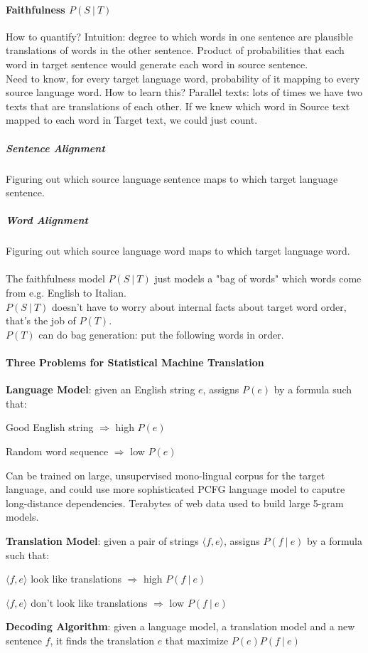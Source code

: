 \documentclass[10pt]{report}
\begin{document}
\paragraph{Faithfulness $P(S\:|\:T)$} How to quantify? Intuition: degree to which words in one sentence are plausible translations of words in the other sentence. Product of probabilities that each word in target sentence would generate each word in source sentence.\\
Need to know, for every target language word, probability of it mapping to every source language word. How to learn this? Parallel texts: lots of times we have two texts that are translations of each other. If we knew which word in Source text mapped to each word in Target text, we could just count.
\subparagraph{Sentence Alignment} Figuring out which source language sentence maps to which target language sentence.
\subparagraph{Word Alignment} Figuring out which source language word maps to which target language word. \\\\
The faithfulness model $P(S\:|\:T)$ just models a "bag of words" which words come from e.g. English to Italian.\\
$P(S\:|\:T)$ doesn't have to worry about internal facts about target word order, that's the job of $P(T)$.\\
$P(T)$ can do bag generation: put the following words in order.
\paragraph{Three Problems for Statistical Machine Translation}
\begin{list}{}{}
	\item \textbf{Language Model}: given an English string $e$, assigns $P(e)$ by a formula such that:
	\begin{list}{}{}
		\item Good English string $\Rightarrow$ high $P(e)$
		\item Random word sequence $\Rightarrow$ low $P(e)$
	\end{list}
	Can be trained on large, unsupervised mono-lingual corpus for the target language, and could use more sophisticated PCFG language model to caputre long-distance dependencies. Terabytes of web data used to build large 5-gram models.
	\item \textbf{Translation Model}: given a pair of strings $\langle f,e\rangle$, assigns $P(f\:|\:e)$ by a formula such that:
	\begin{list}{}{}
		\item $\langle f,e\rangle$ look like translations $\Rightarrow$ high $P(f\:|\:e)$
		\item $\langle f,e\rangle$ don't look like translations $\Rightarrow$ low $P(f\:|\:e)$
	\end{list}
	\item \textbf{Decoding Algorithm}: given a language model, a translation model and a new sentence $f$, it finds the translation $e$ that maximize $P(e)P(f\:|\:e)$
\end{list}
\end{document}
